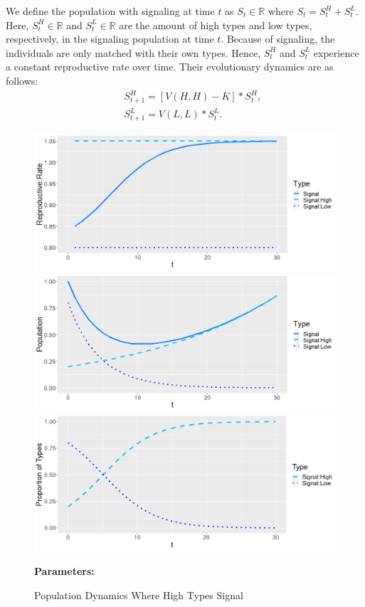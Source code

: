  We define the population with signaling at time $t$ as $S_t \in \mathbb{R}$ where $S_t = S^H_t + S^L_t$. Here, $S^H_t \in \mathbb{R}$ and $S^L_t \in \mathbb{R}$ are the amount of high types and low types, respectively, in the signaling population at time $t$. Because of signaling, the individuals are only matched with their own types. Hence, $S^H_t$ and $S^L_t$ experience a constant reproductive rate over time. Their evolutionary dynamics are as follows: 
\begin{eqnarray}
   && S^H_{t+1}=[V(H,H)-K]*S^H_t, \label{signaldynamic1}\\
&&     S^L_{t+1}=V(L,L)*S^L_t. \label{signaldynamic2}
\end{eqnarray}



\begin{figure}[p]
  \caption{Population Dynamics Where High Types Signal}
   \label{fig:Signal}
    \includegraphics[width=\textwidth, height=.28\textheight]{Images/Rate_Signal.png}
    \includegraphics[width=\textwidth, height=.28\textheight]{Images/Pop_Signal.png}
    \includegraphics[width=\textwidth, height=.28\textheight]{Images/Prop_Signal.png}
 \begin{minipage}[c]{.2\textwidth}
    \textbf{Parameters:}
    \end{minipage}\hfill
    \begin{minipage}[c]{.2\textwidth}
    

\end{minipage}
\end{figure}
